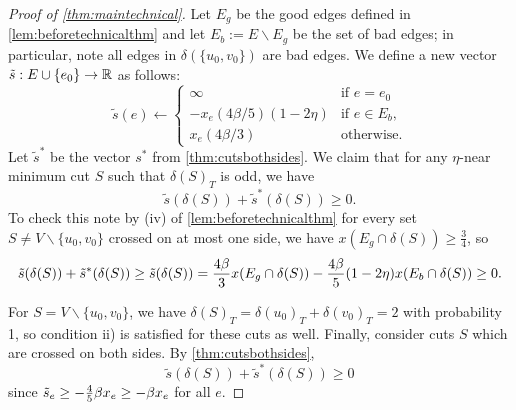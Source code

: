 \begin{proof}[Proof of \cref{thm:maintechnical}]
Let $E_g$ be the good edges defined in \cref{lem:beforetechnicalthm} and let $E_b:=E\smallsetminus E_g$ be the set of bad edges; in particular, note all edges in $\delta(\{u_0,v_0\})$ are bad edges. We define a new vector $\tilde{s}:E\cup \{e_0\}\to\mathbb{R}$ as follows: 
\begin{equation}\label{eq:tildesdef}\tilde{s}(e)\gets \begin{cases}\infty & \text{if } e=e_0\\
-x_e(4\beta/5)(1-2\eta) & \text{if } e\in E_b,\\
x_e(4\beta/3) & \text{otherwise.}
\end{cases}
\end{equation}
Let $\tilde{s}^*$ be the vector $s^*$ from \cref{thm:cutsbothsides}.
We claim that for any  $\eta$-near minimum cut $S$ such that $\delta(S)_T$ is odd, we have 
$$ \tilde{s}(\delta(S))+\tilde{s}^*(\delta(S))\geq 0.$$
To check this note by (iv) of \cref{lem:beforetechnicalthm} for every set $S\neq V\smallsetminus \{u_0,v_0\}$ crossed on at most one side, we have $x(E_g \cap \delta(S)) \ge \frac{3}{4}$, so
\begin{equation}\label{eq:tildeScutsok}\tilde{s}(\delta(S))+\tilde{s}^*(\delta(S))\geq \tilde{s}(\delta(S)) = \frac{4\beta}{3} x(E_g\cap\delta(S)) - \frac{4\beta}{5}(1-2\eta)x(E_b\cap\delta(S))\geq 0.	
\end{equation}

For $S=V\smallsetminus \{u_0,v_0\}$, we have $\delta(S)_T=\delta(u_0)_T + \delta(v_0)_T=2$ with probability 1, so condition ii) is satisfied for these cuts as well.
Finally, consider cuts  $S$ which are crossed on both sides. By \cref{thm:cutsbothsides},
\begin{equation}\label{eq:tildeScutstwo}\tilde{s}(\delta(S)) + \tilde{s}^*(\delta(S)) \geq 0	
\end{equation}
since $\tilde{s}_e\geq -\frac{4}{5}\beta x_e \ge -\beta x_e$ for all $e$.


\end{proof}
